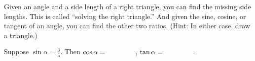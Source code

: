 Given an angle and a side length of a right triangle, you can find the missing side lengths.  This is called ``solving the right triangle.''    And given the sine, cosine, or tangent of an angle, you can find the other two ratios.  (Hint: In either case, draw a triangle.)

%

\begin{prob}
Suppose $\sin\alpha = \frac{3}{5}$.  Then $\cos\alpha = \hspace{0.6in}$, $\tan\alpha = \hspace{0.6in}$.  
\end{prob}


